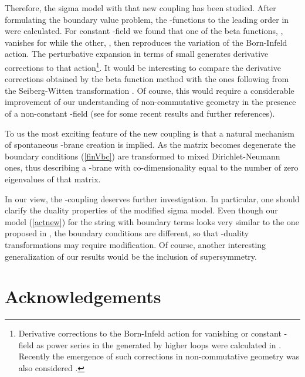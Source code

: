 \documentclass[a4paper,12pt]{article}
\begin{document}
Therefore, the sigma model with that new
coupling has been studied. After formulating the boundary
value problem,   the \myHighlight{$\beta$}\coordHE{}-functions to the
leading order in \coordHE{} were calculated. 
For constant \coordHE{}-field we found that one of the beta functions,
\coordHE{}, vanishes for \coordHE{} while the other, \coordHE{}, then reproduces
the variation of the Born-Infeld action. The perturbative expansion
in terms of
small \coordHE{} generates derivative corrections to that action\footnote
{Derivative corrections to the Born-Infeld action for vanishing or constant
\coordHE{}-field as power series in the \coordHE{} generated by higher
loops were calculated in \cite{AT1,AT2}. Recently the emergence of such
corrections in non-commutative geometry was also considered
\cite{Okawa00,Cornalba99}.}. 
It would be interesting to compare the derivative
corrections obtained by the beta function method with the ones following
from the Seiberg-Witten transformation \cite{Seiberg99}. 
Of course, this would require a considerable improvement of our
understanding of non-commutative geometry in the presence of a
non-constant \coordHE{}-field (see \cite{Ho00} for some recent results
and further references).

To us the most exciting feature of the new coupling is that a natural 
mechanism
of spontaneous \coordHE{}-brane creation
is implied. As the matrix \coordHE{} becomes degenerate the boundary conditions (\ref{finVbc})
are transformed to  mixed Dirichlet-Neumann ones,
thus describing a \coordHE{}-brane with co-dimensionality equal to the
number of zero eigenvalues of that matrix. 

In our view, the \coordHE{}-coupling deserves further investigation.
In particular,
one should clarify the duality properties of the modified
sigma model. Even though our model (\ref{actnew}) for the string with
boundary terms looks very similar
to the one proposed in \cite{DLP89,Leigh89}, the boundary conditions
are different, so that \coordHE{}-duality transformations may require
modification. Of course, another interesting generalization of our
results would be the inclusion of supersymmetry.  

\section*{Acknowledgements}
\end{document}
